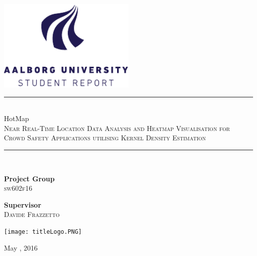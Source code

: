 \begin{titlepage}
\begin{center}
\newcommand{\HRule}{\rule{\linewidth}{0.5mm}}

\includegraphics[width=0.5\textwidth]{figures/aau_logo_en.pdf}~\\[1cm]


\vspace{0.5em}
\HRule \\[0.1cm]
{ 
\Huge HotMap \\\large\textsc{Near Real-Time Location Data Analysis and Heatmap Visualisation for Crowd Safety Applications utilising Kernel Density Estimation}\\
}

\HRule \\[1.5cm]

\begin{minipage}{0.4\textwidth}
\begin{flushleft} \large
\textbf{Project Group}\\
\textsc{sw602f16}
\end{flushleft}
\end{minipage}
\begin{minipage}{0.4\textwidth}
\begin{flushright} \large
\textbf{Supervisor} \\
\textsc{Davide Frazzetto}
\end{flushright}
\end{minipage}

\begin{center}
\texttt{[image: titleLogo.PNG]}
\end{center}


\vfill

{\large May , 2016}

\end{center}
\end{titlepage}
